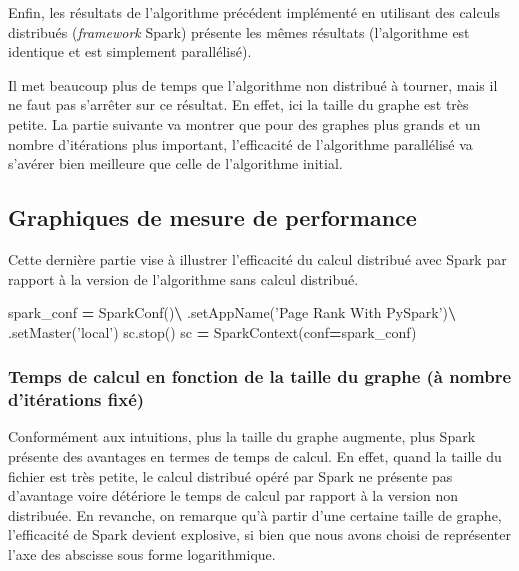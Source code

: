 \documentclass[10pt,a4paper]{article}
\newenvironment{Shaded}{\begin{snugshade}}{\end{snugshade}}
\newcommand{\NormalTok}[1]{#1}
\newcommand{\OperatorTok}[1]{\textcolor[rgb]{0.81,0.36,0.00}{\textbf{#1}}}
\newcommand{\StringTok}[1]{\textcolor[rgb]{0.31,0.60,0.02}{#1}}
\theoremstyle{break}
\begin{document}
Enfin, les résultats de l'algorithme précédent implémenté en utilisant des calculs distribués (\emph{framework} Spark) présente les mêmes résultats (l'algorithme est identique et est simplement parallélisé).

Il met beaucoup plus de temps que l'algorithme non distribué à tourner, mais il ne faut pas s'arrêter sur ce résultat. En effet, ici la taille du graphe est très petite. La partie suivante va montrer que pour des graphes plus grands et un nombre d'itérations plus important, l'efficacité de l'algorithme parallélisé va s'avérer bien meilleure que celle de l'algorithme initial.

\hypertarget{graphiques-de-mesure-de-performance}{%
\subsection{Graphiques de mesure de performance}\label{graphiques-de-mesure-de-performance}}

Cette dernière partie vise à illustrer l'efficacité du calcul distribué avec Spark par rapport à la version de l'algorithme sans calcul distribué.

\begin{Shaded}
\begin{Highlighting}[]
\NormalTok{spark_conf }\OperatorTok{=}\NormalTok{ SparkConf()}\OperatorTok{\textbackslash{}}
\NormalTok{    .setAppName(}\StringTok{'Page Rank With PySpark'}\NormalTok{)}\OperatorTok{\textbackslash{}}
\NormalTok{    .setMaster(}\StringTok{'local'}\NormalTok{)}
\NormalTok{sc.stop()}
\NormalTok{sc }\OperatorTok{=}\NormalTok{ SparkContext(conf}\OperatorTok{=}\NormalTok{spark_conf)}
\end{Highlighting}
\end{Shaded}

\hypertarget{temps-de-calcul-en-fonction-de-la-taille-du-graphe-uxe0-nombre-dituxe9rations-fixuxe9}{%
\subsubsection{Temps de calcul en fonction de la taille du graphe (à nombre d'itérations fixé)}\label{temps-de-calcul-en-fonction-de-la-taille-du-graphe-uxe0-nombre-dituxe9rations-fixuxe9}}

Conformément aux intuitions, plus la taille du graphe augmente, plus Spark présente des avantages en termes de temps de calcul. En effet, quand la taille du fichier est très petite, le calcul distribué opéré par Spark ne présente pas d'avantage voire détériore le temps de calcul par rapport à la version non distribuée. En revanche, on remarque qu'à partir d'une certaine taille de graphe, l'efficacité de Spark devient explosive, si bien que nous avons choisi de représenter l'axe des abscisse sous forme logarithmique.
\end{document}
